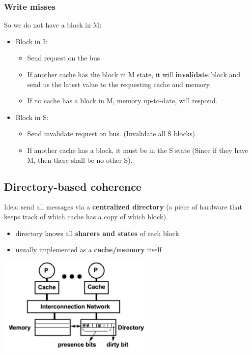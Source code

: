 \documentclass[letterpaper,12pt]{article}
\begin{document}
\subsubsection{Write misses}
So we do not have a block in M:
\begin{itemize}
    \item Block in I:\begin{itemize}
              \item Send request on the bus
              \item If another cache has the block in M state, it will \textbf{invalidate} block and send us the latest value to the requesting cache and memory.
              \item If no cache has a block in M, memory up-to-date, will respond.
          \end{itemize}
    \item Block in S:\begin{itemize}
              \item Send invalidate request on bus. (Invalidate all S blocks)
              \item If another cache has a block, it must be in the S state (Since if they have M, then there shall be no other S).
          \end{itemize}
\end{itemize}
\subsection{Directory-based coherence}
Idea: send all messages via a \textbf{centralized directory} (a piece of hardware that keeps track of which cache has a copy of which block).
\begin{itemize}
    \item directory knows all \textbf{sharers and states} of each block
    \item usually implemented as a \textbf{cache/memory} itself
\end{itemize}
\includegraphics*{./Image/Directory-based cache coherence.jpg}
\end{document}
